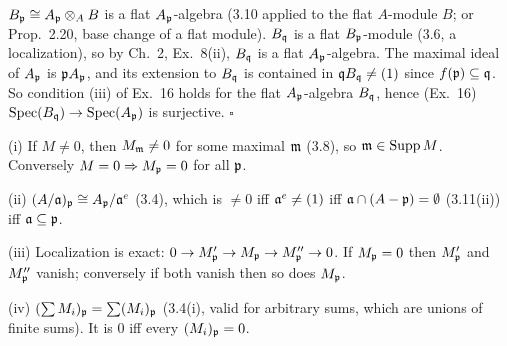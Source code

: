 \documentclass[11pt]{article}
\begin{document}
$B_\mathfrak p\cong A_\mathfrak p\otimes_AB$ is a flat $A_\mathfrak p$-algebra (3.10 applied to the flat $A$-module $B$; or Prop.~2.20, base change of a flat module). $B_\mathfrak q$ is a flat $B_\mathfrak p$-module (3.6, a localization), so by Ch.~2, Ex.~8(ii), $B_\mathfrak q$ is a flat $A_\mathfrak p$-algebra. The maximal ideal of $A_\mathfrak p$ is $\mathfrak p A_\mathfrak p$, and its extension to $B_\mathfrak q$ is contained in $\mathfrak q B_\mathfrak q\ne(1)$ since $f(\mathfrak p)\subseteq\mathfrak q$. So condition (iii) of Ex.~16 holds for the flat $A_\mathfrak p$-algebra $B_\mathfrak q$, hence (Ex.~16) $\operatorname{Spec}(B_\mathfrak q)\to\operatorname{Spec}(A_\mathfrak p)$ is surjective. \hfill$\square$

\pf
(i) If $M\ne0$, then $M_\mathfrak m\ne0$ for some maximal $\mathfrak m$ (3.8), so $\mathfrak m\in\operatorname{Supp} M$. Conversely $M=0\Rightarrow M_\mathfrak p=0$ for all $\mathfrak p$.

(ii) $(A/\mathfrak a)_\mathfrak p\cong A_\mathfrak p/\mathfrak a^e$ (3.4), which is $\ne0$ iff $\mathfrak a^e\ne(1)$ iff $\mathfrak a\cap(A-\mathfrak p)=\emptyset$ (3.11(ii)) iff $\mathfrak a\subseteq\mathfrak p$.

(iii) Localization is exact: $0\to M'_\mathfrak p\to M_\mathfrak p\to M''_\mathfrak p\to0$. If $M_\mathfrak p=0$ then $M'_\mathfrak p$ and $M''_\mathfrak p$ vanish; conversely if both vanish then so does $M_\mathfrak p$.

(iv) $(\sum M_i)_\mathfrak p=\sum(M_i)_\mathfrak p$ (3.4(i), valid for arbitrary sums, which are unions of finite sums). It is $0$ iff every $(M_i)_\mathfrak p=0$.
\end{document}
